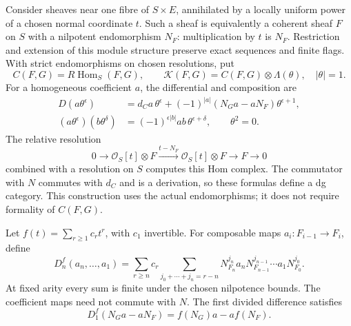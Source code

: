 Consider sheaves near one fibre of \(S\times E\), annihilated by a
locally uniform power of a chosen normal coordinate \(t\).  Such a
sheaf is equivalently a coherent sheaf \(F\) on \(S\) with a nilpotent
endomorphism \(N_F\): multiplication by \(t\) is \(N_F\).
Restriction and extension of this module structure preserve exact
sequences and finite flags.  With strict endomorphisms on chosen
resolutions, put
\[
 C(F,G)=R\operatorname{Hom}_S(F,G),\qquad
 \mathcal K(F,G)=C(F,G)\otimes\Lambda(\theta),\quad |\theta|=1.
\]
For a homogeneous coefficient \(a\), the differential and composition are
\begin{align*}
 D(a\theta^\epsilon)
 &=d_Ca\,\theta^\epsilon
   +(-1)^{|a|}(N_Ga-aN_F)\theta^{\epsilon+1},\\
 (a\theta^\epsilon)(b\theta^\delta)
 &=(-1)^{\epsilon|b|}ab\,\theta^{\epsilon+\delta},
 \qquad \theta^2=0.
\end{align*}
The relative resolution
\[
 0\longrightarrow\mathcal O_S[t]\otimes F
 \xrightarrow{t-N_F}\mathcal O_S[t]\otimes F
 \longrightarrow F\longrightarrow0
\]
combined with a resolution on \(S\) computes this Hom complex.  The commutator with \(N\) commutes with \(d_C\) and is a
derivation, so these formulas define a dg category.  This construction
uses the actual endomorphisms; it does not require formality of
\(C(F,G)\).

Let \(f(t)=\sum_{r\ge1}c_rt^r\), with \(c_1\) invertible.  For
composable maps \(a_i:F_{i-1}\to F_i\), define
\[
 D_n^f(a_n,\ldots,a_1)=
 \sum_{r\ge n}c_r
 \sum_{j_0+\cdots+j_n=r-n}
 N_{F_n}^{j_n}a_nN_{F_{n-1}}^{j_{n-1}}
 \cdots a_1N_{F_0}^{j_0}.
\]
At fixed arity every sum is finite under the chosen nilpotence bounds.
The coefficient maps need not commute with \(N\).  The first divided
difference satisfies
\[
 D_1^f(N_Ga-aN_F)=f(N_G)a-af(N_F).
\]

